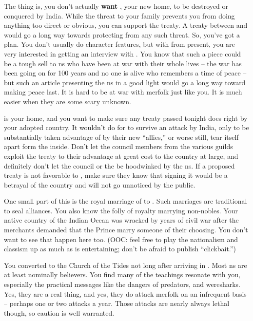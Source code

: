 \documentclass[char]{NeptuneBall}
\begin{document}
The thing is, you don't actually \textbf{want} \pAtlantis{}, your new home, to be destroyed or conquered by India. While the threat to your family prevents you from doing anything too direct or obvious, you can support the treaty. A treaty between \pAtlantis{} and \pPacifica{} would go a long way towards protecting \pAtlantis{} from any such threat. So, you've got a plan. You don't usually do character features, but with \cPrince{\aprince} from \pPacifica{} present, you are very interested in getting an interview with \cPrince{\them}. You know that such a piece could be a tough sell to \pAtlantis{}ns who have been at war with \pPacifica{} their whole lives -- the war has been going on for 100 years and no one is alive who remembers a time of peace -- but such an article presenting the \pPacifica{}ns in a good light would go a long way toward making peace last. It is hard to be at war with merfolk just like you. It is much easier when they are some scary unknown.

\pAtlantis{} is your home, and you want to make sure any treaty passed tonight does right by your adopted country. It wouldn't do for \pAtlantis{} to survive an attack by India, only to be substantially taken advantage of by their new ``allies,'' or worse still, tear itself apart form the inside. Don't let the council members from the various guilds exploit the treaty to their advantage at great cost to the country at large, and definitely don't let the council or the \cKing{\King} be hoodwinked by the \pPacifica{}ns. If a proposed treaty is not favorable to \pAtlantis{}, make sure they know that signing it would be a betrayal of the country and will not go unnoticed by the public. 

One small part of this is the royal marriage of \cPrincess{} to \cPrince{}. Such marriages are traditional to seal alliances. You also know the folly of royalty marrying non-nobles. Your native country of the Indian Ocean was wracked by years of civil war after the merchants demanded that the Prince marry someone of their choosing. You don't want to see that happen here too. (OOC: feel free to play the nationalism and classism up as much as is entertaining; don't be afraid to publish ``clickbait.'')

You converted to the Church of the Tides not long after arriving in \pAtlantis{}. Most \pAtlantis{}ns are at least nominally believers. You find many of the teachings resonate with you, especially the practical messages like the dangers of predators, and weresharks. Yes, they are a real thing, and yes, they do attack merfolk on an infrequent basis -- perhaps one or two attacks a year. Those attacks are nearly always lethal though, so caution is well warranted.
\end{document}
